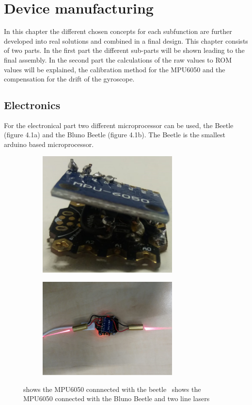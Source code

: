 \documentclass[whitelogo]{tudelft-report}
\begin{document}
{{{{\chapter{Device manufacturing} 
In this chapter the different chosen concepts for each subfunction are further developed into real solutions and combined in a final design. This chapter consists of two parts. In the first part the different sub-parts will be shown leading to the final assembly. In the second part the calculations of the raw values to ROM values will be explained, the calibration method for the MPU6050 and the compensation for the drift of the gyroscope.  
\section{Electronics}
For the electronical part two different microprocessor can be used, the Beetle (figure 4.1a) and the Bluno Beetle (figure 4.1b). The Beetle is the smallest arduino based microprocessor.

\begin{figure}[H]
	\centering
\begin{subfigure}[b]{0.5\linewidth}
			\centering\includegraphics[width=200pt]{mpu6050_with_beetle.jpg}
			\caption{\label{fig:fig1}}
		\end{subfigure}%
	\begin{subfigure}[b]{0.5\linewidth}
		\centering\includegraphics[width=200pt]{laser_combined_with_microprocessor.jpg}
		\caption{\label{fig:fig2}}
	\end{subfigure}
	\caption{ shows the MPU6050 connnected with the beetle~ shows the MPU6050 connected with the Bluno Beetle and two line lasers}
\end{figure}

}}}}
\end{document}
